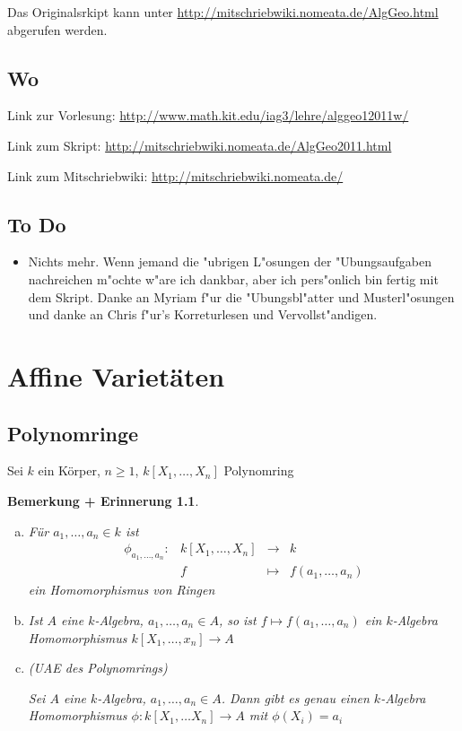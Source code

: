 \documentclass[a4paper, 12pt, numbers=noendperiod, chapterprefix=true]{scrbook}
\theoremstyle{break}
\newtheorem{BemErinn}[Def]{Bemerkung + Erinnerung}
\theoremstyle{nonumberbreak}
\theoremstyle{nonumberplain}
\begin{document}
Das Originalsrkipt kann unter \url{http://mitschriebwiki.nomeata.de/AlgGeo.html} abgerufen werden.

\section*{Wo}
Link zur Vorlesung: \url{http://www.math.kit.edu/iag3/lehre/alggeo12011w/}

Link zum Skript: \url{http://mitschriebwiki.nomeata.de/AlgGeo2011.html}

Link zum Mitschriebwiki: \url{http://mitschriebwiki.nomeata.de/}

\section*{To Do}\begin{itemize}
\item Nichts mehr. Wenn jemand die "ubrigen L"osungen der "Ubungsaufgaben nachreichen m"ochte w"are ich dankbar, aber ich pers"onlich bin fertig mit dem Skript. Danke an Myriam f"ur die "Ubungsbl"atter und Musterl"osungen und danke an Chris f"ur's Korreturlesen und Vervollst"andigen.
\end{itemize}


\chapter{Affine Variet\"aten}

\section{Polynomringe}

Sei $k$ ein K\"orper, $n \geq 1$, $k[X_1,\dots,X_n]$ Polynomring

\begin{BemErinn}\label{bemerinn:1.1}
\begin{enumerate}[a)]
\item F\"ur $a_1, \dots, a_n \in k$ ist
	\[\begin{array}{lccc}
		\phi_{a_1,\dots,a_n}: &k[X_1, \dots, X_n] &\to& k \\
		&f &\mapsto& f(a_1, \dots, a_n)
	\end{array}\]
	ein Homomorphismus von Ringen
	
\item Ist $A$ eine $k$-Algebra, $a_1,\dots, a_n \in A$, so ist $f \mapsto f(a_1, \dots,a_n)$ ein $k$-Algebra Homomorphismus $k[X_1,\dots,x_n] \to A$
	
\item (UAE des Polynomrings)

	Sei $A$ eine $k$-Algebra, $a_1,\dots,a_n\in A$. Dann gibt es genau einen $k$-Algebra Homomorphismus $\phi:k[X_1,\dots X_n] \to A$ mit $\phi(X_i) = a_i$\label{bemerinn:1.1.c}
\end{enumerate}
\end{BemErinn}
\end{document}
